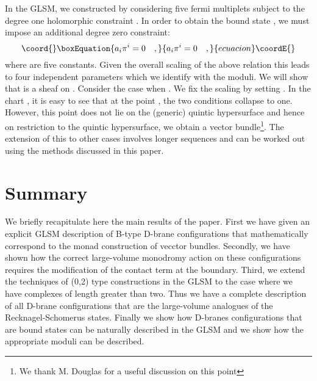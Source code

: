 \documentclass[a4paper,12pt]{article}
\begin{document}
In the GLSM, we constructed \coordHE{} by considering five fermi 
multiplets \coordHE{} subject to the degree one holomorphic constraint \coordHE{}. In order to obtain the bound state \coordHE{}, we must
impose an additional degree zero constraint:
\begin{equation}\coord{}\boxEquation{
a_i \pi^i =0\quad,
}{
a_i \pi^i =0\quad,
}{ecuacion}\coordE{}\end{equation}
where \coordHE{} are five constants.  Given the overall scaling of the above
relation this leads to four independent parameters which we identify
with the moduli. We will show that \coordHE{} is a sheaf on \coordHE{}.
Consider the case when \coordHE{}. We fix the scaling by setting
\coordHE{}. In the chart \coordHE{}, it is easy to see that at the point
\coordHE{}, the two conditions collapse to one. However,
this point does not lie on the (generic) quintic hypersurface and hence
on restriction to the quintic hypersurface, we obtain a vector
bundle\footnote{We thank M. Douglas for a useful discussion on this
point}. The extension of this to other cases involves longer sequences
and can be worked out using the methods discussed in this paper.



\section{Summary}

We briefly recapitulate here the main results of the paper. 
First we
have given an explicit GLSM description of B-type D-brane configurations
that mathematically correspond to the monad construction of vecctor 
bundles. Secondly, we have shown how the correct large-volume 
monodromy action on these configurations requires the modification of 
the contact term at the boundary. Third, we extend the techniques of
(0,2) type constructions in the GLSM to the case where we have complexes
of length greater than two. Thus we have a complete description of all
D-brane configurations that are the large-volume analogues of the
\coordHE{} Recknagel-Schomerus states. Finally we show how D-branes
configurations that are bound
states can be naturally described in the GLSM and we show how the
appropriate moduli can be described. 
\end{document}
